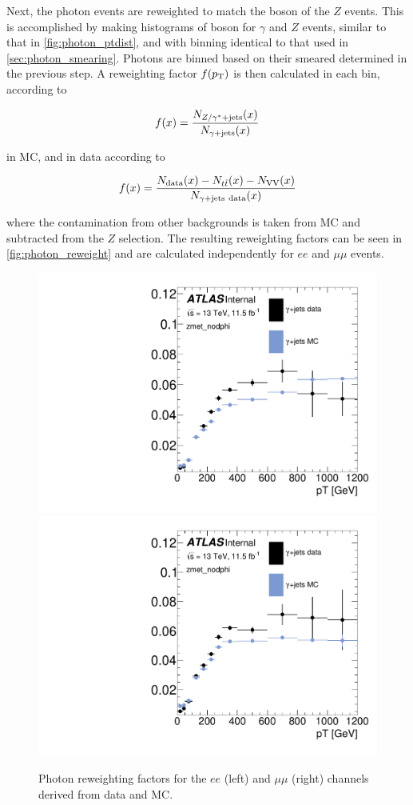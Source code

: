 Next, the photon events are reweighted to match the boson \pt of the $Z$ events. This is accomplished by making histograms of boson \pt for $\gamma$ and $Z$ events, similar to that in \autoref{fig:photon_ptdist}, and with binning identical to that used in \autoref{sec:photon_smearing}. Photons are binned based on their smeared \pt determined in the previous step. A reweighting factor $f(p_{\text{T}})$ is then calculated in each bin, according to

\begin{equation}
f(x) = \frac{N_{Z/\gamma^{*}+\text{jets}}(x)}{N_{\gamma+\text{jets}}(x)}
\end{equation}

in \ac{MC}, and in data according to

\begin{equation}
f(x) = \frac{N_{\text{data}}(x)-N_{t\bar{t}}(x)-N_{\text{VV}}(x)}{N_{\gjets\ \text{data}}(x)}
\end{equation}

where the contamination from other backgrounds is taken from \ac{MC} and subtracted from the $Z$ selection. The resulting reweighting factors can be seen in \autoref{fig:photon_reweight} and are calculated independently for $ee$ and $\mu\mu$ events.

\begin{centering}
\begin{figure}[!hbt]
\myfloatalign
\includegraphics[width=.45\linewidth]{figures/photons/Corr_hist_ptrw_ee_2j_2016_mcmetl_ptsmrw_smear_zmet_nodphi_.pdf}
\includegraphics[width=.45\linewidth]{figures/photons/Corr_hist_ptrw_mm_2j_2016_mcmetl_ptsmrw_smear_zmet_nodphi_.pdf}
\caption{Photon reweighting factors for the $ee$ (left) and $\mu\mu$ (right) channels derived from data and \ac{MC}.}
\label{fig:photon_reweight}
\end{figure}
\end{centering}


